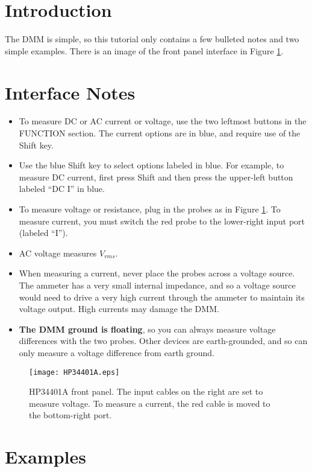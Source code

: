 \documentclass{article}
\begin{document}
\thispagestyle{plain}


\section{Introduction}
The DMM is simple, so this tutorial only contains a few bulleted notes and two simple examples. There is an image of the front panel interface in Figure \ref{frontpanel}.

\section{Interface Notes}
\begin{itemize}
\item To measure DC or AC current or voltage, use the two leftmost buttons in the FUNCTION section. The current options are in blue, and require use of the Shift key.
\item Use the blue Shift key to select options labeled in blue. For example, to measure DC current, first press Shift and then press the upper-left button labeled ``DC I'' in blue.
\item To measure voltage or resistance, plug in the probes as in Figure \ref{frontpanel}. To measure current, you must switch the red probe to the lower-right input port (labeled ``I'').
\item AC voltage measures $V_{rms}$.
\item When measuring a current, never place the probes across a voltage source. The ammeter has a very small internal impedance, and so a voltage source would need to drive a very high current through the ammeter to maintain its voltage output. High currents may damage the DMM.
\item \textbf{The DMM ground is floating}, so you can always measure voltage differences with the two probes. Other devices are earth-grounded, and so can only measure a voltage difference from earth ground.
\end{itemize}


\begin{figure}[!htb]
  \centering
  \texttt{[image: HP34401A.eps]}
  \caption{HP34401A front panel. The input cables on the right are set to measure voltage. To measure a current, the red cable is moved to the bottom-right port.}
  \label{frontpanel}
\end{figure}

\section{Examples}
\end{document}
